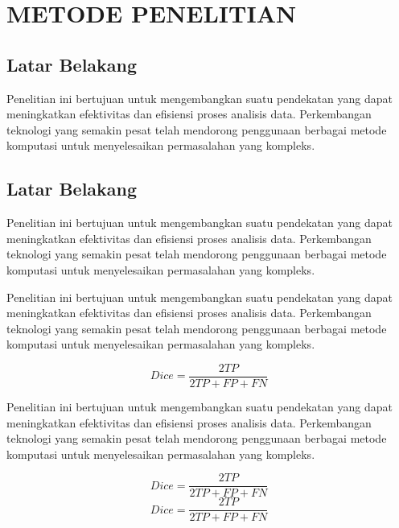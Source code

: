 \chapter{METODE PENELITIAN}

\section{Latar Belakang}

Penelitian ini bertujuan untuk mengembangkan suatu pendekatan yang dapat meningkatkan efektivitas dan efisiensi proses analisis data. Perkembangan teknologi yang semakin pesat telah mendorong penggunaan berbagai metode komputasi untuk menyelesaikan permasalahan yang kompleks.

\section{Latar Belakang}

Penelitian ini bertujuan untuk mengembangkan suatu pendekatan yang dapat meningkatkan efektivitas dan efisiensi proses analisis data. Perkembangan teknologi yang semakin pesat telah mendorong penggunaan berbagai metode komputasi untuk menyelesaikan permasalahan yang kompleks.

Penelitian ini bertujuan untuk mengembangkan suatu pendekatan yang dapat meningkatkan efektivitas dan efisiensi proses analisis data. Perkembangan teknologi yang semakin pesat telah mendorong penggunaan berbagai metode komputasi untuk menyelesaikan permasalahan yang kompleks.

\begin{equation}
    Dice = \frac{2TP}{2TP + FP + FN}
    \label{eq:dice}
\end{equation}

Penelitian ini bertujuan untuk mengembangkan suatu pendekatan yang dapat meningkatkan efektivitas dan efisiensi proses analisis data. Perkembangan teknologi yang semakin pesat telah mendorong penggunaan berbagai metode komputasi untuk menyelesaikan permasalahan yang kompleks.

\begin{equation}
    Dice = \frac{2TP}{2TP + FP + FN}
    \label{eq:dice}
\end{equation}
\begin{equation}
    Dice = \frac{2TP}{2TP + FP + FN}
    \label{eq:dice}
\end{equation}

